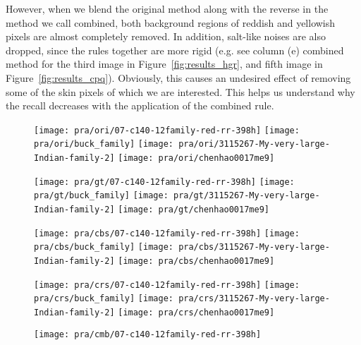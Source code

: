 However, when we blend the original method along with the reverse in the method we call combined, both background regions of reddish and yellowish pixels are almost completely removed. In addition, salt-like noises are also dropped, since the rules together are more rigid (e.g. see column (e) combined method for the third image in Figure~\ref{fig:results_hgr}, and fifth image in Figure~\ref{fig:results_cpq}). Obviously, this causes an undesired effect of removing some of the skin pixels of which we are interested. This helps us understand why the recall decreases with the application of the combined rule.

\begin{figure*}[!htb]
    \centering
    \begin{subfigure}[t]{0.15\textwidth}
        \texttt{[image: pra/ori/07-c140-12family-red-rr-398h]}
        \texttt{[image: pra/ori/buck\_family]}
        \texttt{[image: pra/ori/3115267-My-very-large-Indian-family-2]}
        \texttt{[image: pra/ori/chenhao0017me9]}
        \caption{}
    \end{subfigure}
    \begin{subfigure}[t]{0.15\textwidth}
        \texttt{[image: pra/gt/07-c140-12family-red-rr-398h]}
        \texttt{[image: pra/gt/buck\_family]}
        \texttt{[image: pra/gt/3115267-My-very-large-Indian-family-2]}
        \texttt{[image: pra/gt/chenhao0017me9]}
        \caption{}
    \end{subfigure}
    \begin{subfigure}[t]{0.15\textwidth}
        \texttt{[image: pra/cbs/07-c140-12family-red-rr-398h]}
        \texttt{[image: pra/cbs/buck\_family]}
        \texttt{[image: pra/cbs/3115267-My-very-large-Indian-family-2]}
        \texttt{[image: pra/cbs/chenhao0017me9]}
        \caption{}
    \end{subfigure}
    \begin{subfigure}[t]{0.15\textwidth}
        \texttt{[image: pra/crs/07-c140-12family-red-rr-398h]}
        \texttt{[image: pra/crs/buck\_family]}
        \texttt{[image: pra/crs/3115267-My-very-large-Indian-family-2]}
        \texttt{[image: pra/crs/chenhao0017me9]}
        \caption{}
    \end{subfigure}
    \begin{subfigure}[t]{0.15\textwidth}
        \texttt{[image: pra/cmb/07-c140-12family-red-rr-398h]}

\end{subfigure}
\end{figure*}
